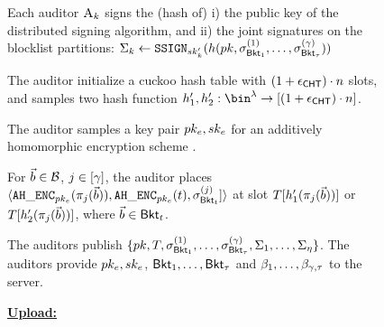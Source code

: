 \begin{figure}
{\begin{minipage}[t]{\textwidth}
%


\item Each auditor $\auditor[\auditorIdx]$ signs the (hash of) i) the public key of the distributed signing algorithm, and ii) the joint signatures on the blocklist partitions:  $\auditorSig{\auditorIdx} \assign \signGenSig[\auditorPrivKeyGenericScheme[\auditorIdx]](\hashFn(\pubKey,  \genericSig[\bucket{1}]^{(1)}, \dots, \genericSig[\bucket{\numBuckets}]^{(\numProjections)}))$




\item\label{fuzzy:pre:cht1} The auditor initialize a cuckoo hash table \cuckooTable with $(1 + \epsilon_{\mathsf{CHT}}) \cdot n$ slots, and samples two hash function $\cuckooHashFn{1}, \cuckooHashFn{2}: \bin^{\secParam} \rightarrow \nats[(1 + \cuckooTableParam) \cdot \blocklistSize]$. 

\item\label{fuzzy:pre:cht2} The auditor samples a key pair $\encryptPubKey, \encryptPrivKey$ for an additively homomorphic encryption scheme \ahencryptionSchemeDefn. 


\item\label{fuzzy:pre:cht3} For $\blocklistVec \in \blocklist$, $\projIdx \in \nats[\numProjections]$, the auditor places $\langle \ahencrypt[\encryptPubKey](\projFn[\projIdx](\blocklistVec)),\ahencrypt[\encryptPubKey](\bucketIdx), \genericSig[\bucket{\bucketIdx}]^{(\projIdx)}] \rangle$ at slot $\cuckooTable[\cuckooHashFn{1}(\projFn[\projIdx](\blocklistVec))]$ or $\cuckooTable[\cuckooHashFn{2}(\projFn[\projIdx](\blocklistVec))]$, where $\blocklistVec \in \bucket{\bucketIdx}$. 



\item The auditors publish  $\{\pubKey, \cuckooTable , \genericSig[\bucket{1}]^{(1)}, \dots, \genericSig[\bucket{\numBuckets}]^{(\numProjections)}, \auditorSig{1}, \dots, \auditorSig{\numAuditors} \}$. The auditors provide $\encryptPubKey, \encryptPrivKey$, $\mathsf{Bkt}_{1}, \dots, \mathsf{Bkt}_{\tau}$ and $\beta_1, \dots, \beta_{
\gamma,\tau}$ to the server. 

\enumListEnd

\medskip\noindent\textbf{\underline{Upload:}} 



\end{minipage}}
\end{figure}
